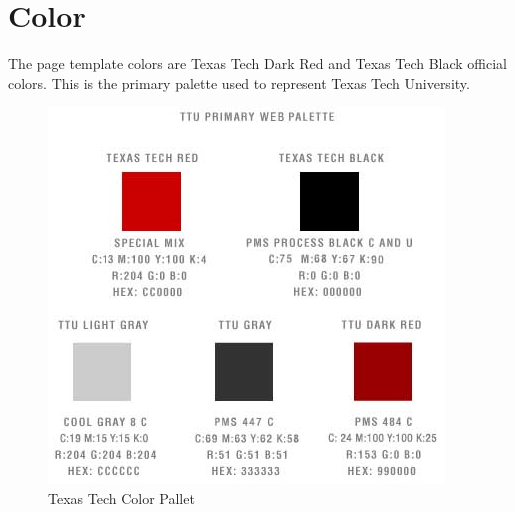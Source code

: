 \section{Color}
The page template colors are Texas Tech Dark Red and Texas Tech Black official colors. This is the primary palette used to represent Texas Tech University.	
\begin{figure}[h!]
  	\centering
  	\includegraphics[scale=1]{Capture.PNG}
	\caption{Texas Tech Color Pallet}
\end{figure}